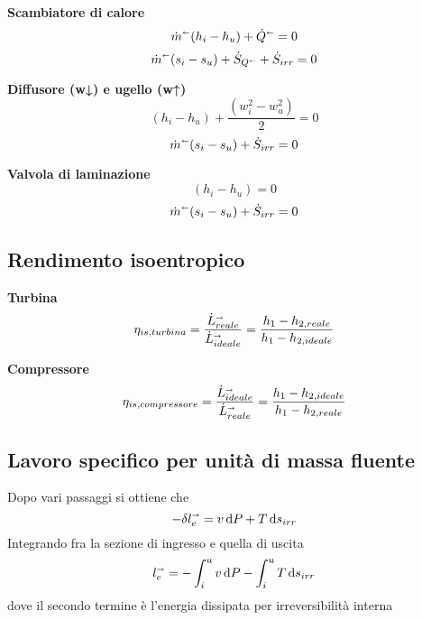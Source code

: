 \textbf{Scambiatore di calore}
\[ \dot{m}^\shortleftarrow (h_i - h_u) + \dot{Q}^\shortleftarrow = 0 \]
\[ \dot{m}^\shortleftarrow (s_i - s_u) + \dot{S}_{Q^\shortleftarrow} + \dot{S}_{irr} = 0 \]

\textbf{Diffusore (w↓) e ugello (w↑)}
\[  (h_i - h_u) + \frac{(w_i^2 - w_u^2)}{2} = 0 \]
\[ \dot{m}^\shortleftarrow (s_i - s_u) + \dot{S}_{irr} = 0 \]

\textbf{Valvola di laminazione}
\[  (h_i - h_u) = 0 \]
\[ \dot{m}^\shortleftarrow (s_i - s_u) + \dot{S}_{irr} = 0 \]

\subsection{Rendimento isoentropico}
\textbf{Turbina}
\[ \eta_{is,turbina} = \frac{\dot{L}_{reale}^\shortrightarrow}{\dot{L}_{ideale}^\shortrightarrow} = \frac{h_1 - h_{2,reale}}{h_1 - h_{2,ideale}} \]

\textbf{Compressore}
\[ \eta_{is,compressore} = \frac{\dot{L}_{ideale}^\shortrightarrow}{\dot{L}_{reale}^\shortrightarrow} = \frac{h_1 - h_{2,ideale}}{h_1 - h_{2,reale}} \]

\subsection{Lavoro specifico per unità di massa fluente}
Dopo vari passaggi si ottiene che
\[ -\delta l_e^\shortrightarrow = v\dd{P} + T\dd{s_{irr}} \]
Integrando fra la sezione di ingresso e quella di uscita
\[ l_e^\shortrightarrow = -\int_i^u v\dd{P} -\int_i^u T\dd{s_{irr}} \]
dove il secondo termine è l'energia dissipata per irreversibilità interna
